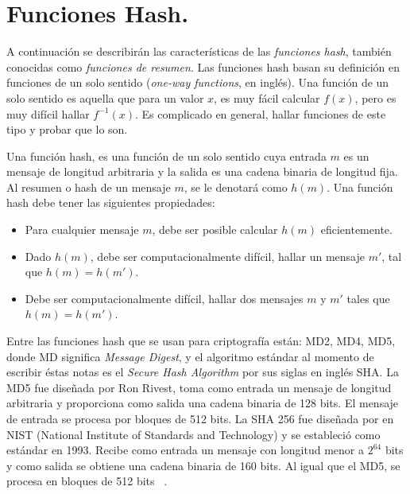 \section{Funciones Hash. }
A continuación se describirán las características de las {\it funciones hash}, también conocidas como {\it funciones de resumen}. Las funciones hash basan su definición en funciones de un solo sentido  ({\it one-way functions}, en inglés). Una función de un solo sentido es aquella que para un valor $x$, es  muy fácil calcular $f(x)$, pero es muy difícil hallar $f^{-1}(x)$. Es complicado en general, hallar funciones de este tipo y probar que lo son.
\begin{definition}
Una función hash, es una función de un solo sentido cuya entrada $m$  es un mensaje de longitud arbitraria y la salida es una cadena binaria de longitud fija. Al resumen o hash de un mensaje $m$, se le denotará como $h(m)$. Una función hash debe
tener las siguientes propiedades:
\begin{itemize}
	\item Para cualquier mensaje $m$, debe ser posible calcular $h(m)$ eficientemente. 
	\item Dado $h(m)$, debe ser computacionalmente difícil, hallar un mensaje $m'$, tal que $h(m)=h(m')$.
	\item Debe ser computacionalmente difícil, hallar dos mensajes $m$ y $m'$ tales que $h(m)=h(m')$.
\end{itemize}
\end{definition}
 
Entre las funciones hash que se usan para criptograf\'ia est\'an: MD2, MD4, MD5, donde MD significa {\it Message Digest}, y el algoritmo est\'andar al momento de escribir \'estas notas es el {\it Secure Hash Algorithm} por sus siglas en ingl\'es SHA.
  La MD5 fue dise\~nada por Ron Rivest, toma como entrada un mensaje de longitud arbitraria y proporciona como salida una cadena binaria de 128 bits.
El mensaje de entrada se procesa por bloques de 512 bits.  La SHA 256 fue dise\~nada por en NIST (National Institute of Standards and Technology) y se estableci\'o como est\'andar en 1993. Recibe como entrada un mensaje con longitud menor a $2^{64}$ bits y
como salida se obtiene una cadena binaria de 160 bits. Al igual que el MD5, se procesa en bloques de 512 bits ~\cite{modes}.


